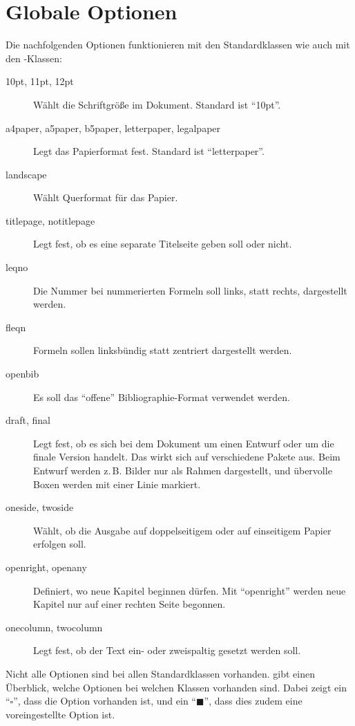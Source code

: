 \section{Globale Optionen}
\label{sec:globaleoptionen}

Die nachfolgenden Optionen funktionieren mit den Standardklassen wie auch mit den \KOMAScript-Klassen:

\begin{description}
	\item[10pt, 11pt, 12pt] Wählt die Schriftgröße im Dokument. Standard ist \enquote{10pt}.
	\item[a4paper, a5paper, b5paper, letterpaper, legalpaper]
		Legt das Papier\-format fest. Standard ist \enquote{letterpaper}.
	\item[landscape] Wählt Querformat für das Papier.
	\item[titlepage, notitlepage] Legt fest, ob es eine separate Titelseite
		geben soll oder nicht.
	\item[leqno] Die Nummer bei nummerierten Formeln soll links, statt rechts,
		dargestellt werden.
	\item[fleqn] Formeln sollen linksbündig statt zentriert dargestellt werden.
	\item[openbib] Es soll das \enquote{offene} Bibliographie-Format verwendet werden.
	\item[draft, final] Legt fest, ob es sich bei dem Dokument um einen Entwurf
	  oder um die finale Version handelt. Das wirkt sich auf verschiedene Pakete
	  aus. Beim Entwurf werden z.\,B. Bilder nur als Rahmen dargestellt, und
	  übervolle Boxen werden mit einer Linie markiert.
	\item[oneside, twoside] Wählt, ob die Ausgabe auf doppelseitigem oder auf 
	  einseitigem Papier erfolgen soll.
	\item[openright, openany] Definiert, wo neue Kapitel beginnen dürfen. Mit
		\enquote{openright} werden neue Kapitel nur auf einer rechten Seite begonnen.
	\item[onecolumn, twocolumn] Legt fest, ob der Text ein- oder zweispaltig
		gesetzt werden soll.
\end{description}

Nicht alle Optionen sind bei allen Standardklassen vorhanden.  gibt einen Überblick, welche Optionen bei welchen Klassen vorhanden sind. Dabei zeigt ein \enquote{$\square$}, dass die Option vorhanden ist, und ein \enquote{$\blacksquare$}, dass dies zudem eine voreingestellte Option ist.

